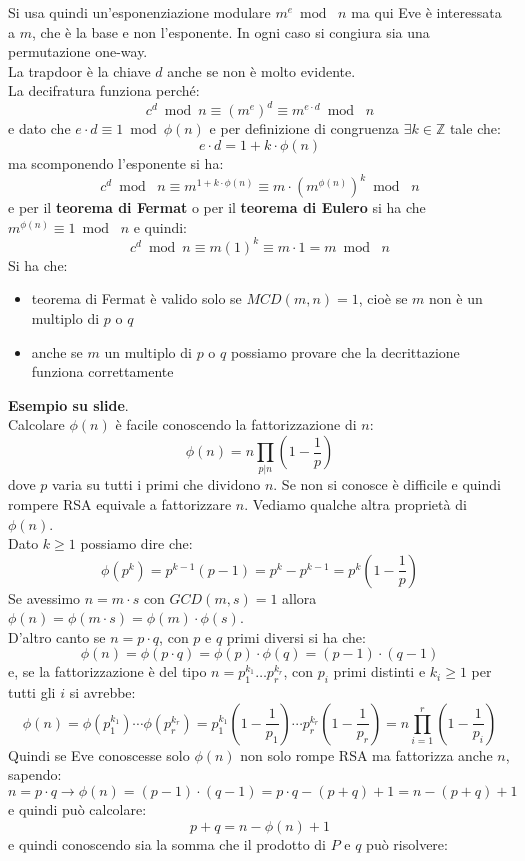 \documentclass[a4paper,12pt, oneside]{book}
\begin{document}
Si usa quindi un'esponenziazione modulare $m^e\bmod\,\,n$ ma qui Eve è
interessata a $m$, che è la base e non l'esponente. In ogni caso si congiura sia
una permutazione one-way.\\
La trapdoor è la chiave $d$ anche se non è molto evidente.\\
La decifratura funziona perché:
\[c^d\bmod n\equiv (m^e)^d\equiv m^{e\cdot d}\bmod\,\,n\]
e dato che $e\cdot d\equiv 1\bmod\phi(n)$ e per definizione di congruenza
$\exists k\in\mathbb{Z}$ tale che:
\[e\cdot d=1+k\cdot\phi(n)\]
ma scomponendo l'esponente si ha:
\[c^d\bmod\,\,n\equiv m^{1+k\cdot\phi(n)}\equiv m\cdot (m^{\phi(n)})^k\bmod \,\,n\]
e per il \textbf{teorema di Fermat} o per il \textbf{teorema di Eulero} si ha
che $m^{\phi(n)}\equiv 1\bmod \,\,n$ e quindi:
\[c^d\bmod n\equiv m(1)^k\equiv m\cdot 1 = m\bmod \,\,n\]
Si ha che:
\begin{itemize}
  \item teorema di Fermat è valido solo se $MCD (m, n) = 1$, cioè se $m$ non è
  un   multiplo di $p$ o $q$ 
  \item anche se $m$ un multiplo di $p$ o $q$  possiamo provare
  che la decrittazione funziona correttamente 
\end{itemize}
\textbf{Esempio su slide}.\\
Calcolare $\phi(n)$ è facile conoscendo la fattorizzazione di $n$:
\[\phi(n)=n\prod_{p|n}\left(1-\frac{1}{p}\right)\]
dove $p$ varia su tutti i primi che dividono $n$. Se non si conosce è difficile
e quindi rompere RSA equivale a  fattorizzare $n$.
Vediamo qualche altra proprietà di $\phi(n)$. \\
Dato $k\geq 1$ possiamo dire che:
\[\phi(p^k)=p^{k-1}(p-1)=p^k-p^{k-1}=p^k\left(1-\frac{1}{p}\right)\]
Se avessimo $n=m\cdot s$ con $GCD(m,s)=1$ allora $\phi(n)=\phi(m\cdot
s)=\phi(m)\cdot \phi(s)$.\\
D'altro canto se $n=p\cdot q$, con $p$ e $q$ primi diversi si ha che:
\[\phi(n)=\phi(p\cdot q)=\phi(p)\cdot \phi(q)=(p-1)\cdot (q-1)\]
e, se la fattorizzazione è del tipo $n=p_1^{k_1}\ldots p_r^{k_r}$, con $p_i$
primi distinti e $k_i\geq 1$ per tutti gli $i$ si avrebbe:
\[\phi(n)=\phi(p_1^{k_1})\cdots
  \phi(p_r^{k_r})=p_1^{k_1}\left(1-\frac{1}{p_1}\right)\cdots
  p_r^{k_r}\left(1-\frac{1}{p_r}\right)=n\prod_{i=1}^r
  \left(1-\frac{1}{p_i}\right)\]
Quindi se Eve conoscesse solo $\phi(n)$ non solo rompe RSA ma fattorizza anche
$n$, sapendo:
\[n=p\cdot q\to \phi(n)=(p-1)\cdot(q-1)=p\cdot q-(p+q)+1=n-(p+q)+1\]
e quindi può calcolare:
\[p+q=n-\phi(n)+1\]
e quindi conoscendo sia la somma che il prodotto di $P$ e $q$ può risolvere:
\end{document}
